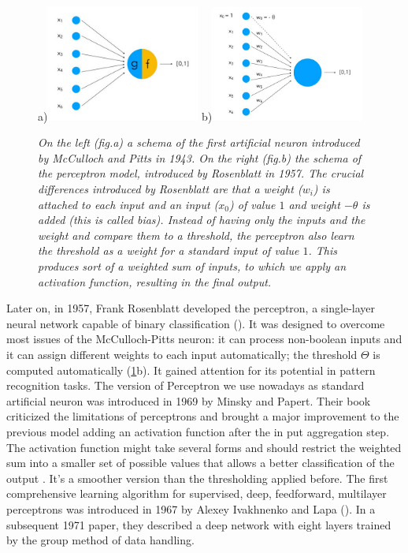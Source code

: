 \documentclass[binding=0.6cm]{sapthesis}
\newcommand{\mycite}[1]{(\cite{#1})}
\begin{document}
\begin{figure}
    \footnotesize a)\includegraphics[width=0.45\textwidth]{imgs/background/mcculloch-pitts-02.png} 
    \footnotesize b)\includegraphics[width=0.45\textwidth]{imgs/background/rosenblatt-02.png} 
    \caption{\textit{On the left (fig.a) a schema of the first artificial neuron introduced by McCulloch and Pitts in 1943. On the right (fig.b) the schema of the perceptron model, introduced by Rosenblatt in 1957. The crucial differences introduced by Rosenblatt are that a weight ($w_i$) is attached to each input and an input ($x_0$) of value $1$ and weight $-\theta$ is added (this is called bias). Instead of having only the inputs and the weight and compare them to a threshold, the perceptron also learn the threshold as a weight for a standard input of value $1$. This produces sort of a weighted sum of inputs, to which we apply an activation function, resulting in the final output.}}
    \label{fig:bg.first-neurons}
\end{figure}
Later on, in 1957, Frank Rosenblatt developed the perceptron, a single-layer neural network capable of binary classification \mycite{rosenblatt-1958-perceptron}.  It was designed to overcome most issues of the McCulloch-Pitts neuron: it can process non-boolean inputs and it can assign different weights to each input automatically; the threshold $\Theta$ is computed automatically (\cref{fig:bg.first-neurons}b). It gained attention for its potential in pattern recognition tasks. The version of Perceptron we use nowadays as standard artificial neuron was introduced in 1969 by Minsky and Papert. Their book criticized the limitations of perceptrons and brought a major improvement to the previous model adding an activation function after the in put aggregation step. The activation function might take several forms and should restrict the weighted sum into a smaller set of possible values that allows a better classification of the output \cite{minsky-papert-1969-perceptrons}. It’s a smoother version than the thresholding applied before. The first comprehensive learning algorithm for supervised, deep, feedforward, multilayer perceptrons was introduced in 1967 by Alexey Ivakhnenko and Lapa \mycite{Ivakhnenko1967CyberneticsAF}.  In a subsequent 1971 paper, they described a deep network with eight layers trained by the group method of data handling. 
\end{document}
